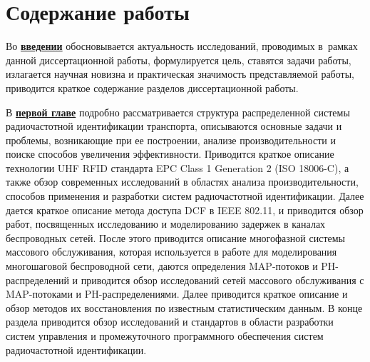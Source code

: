 \section*{Содержание работы}
Во \underline{\textbf{введении}} обосновывается актуальность исследований, проводимых в~рамках данной диссертационной работы, формулируется цель, ставятся задачи работы, излагается научная новизна и практическая значимость представляемой работы, приводится краткое содержание разделов диссертационной работы.

В \underline{\textbf{первой главе}} подробно рассматривается структура распределенной системы радиочастотной идентификации транспорта, описываются основные задачи и проблемы, возникающие при ее построении, анализе производительности и поиске способов увеличения эффективности. Приводится краткое описание технологии UHF RFID стандарта EPC Class 1 Generation 2 (ISO 18006-C), а также обзор современных исследований в областях анализа производительности, способов применения и разработки систем радиочастотной идентификации. Далее дается краткое описание метода доступа DCF в IEEE 802.11, и приводится обзор работ, посвященных исследованию и моделированию задержек в каналах беспроводных сетей. После этого приводится описание многофазной системы массового обслуживания, которая используется в работе для моделирования многошаговой беспроводной сети, даются определения MAP-потоков и PH-распределений и приводится обзор исследований сетей массового обслуживания с MAP-потоками и PH-распределениями. Далее приводится краткое описание и обзор методов их восстановления по известным статистическим данным. В конце раздела приводится обзор исследований и стандартов в области разработки систем управления и промежуточного программного обеспечения систем радиочастотной идентификации.



